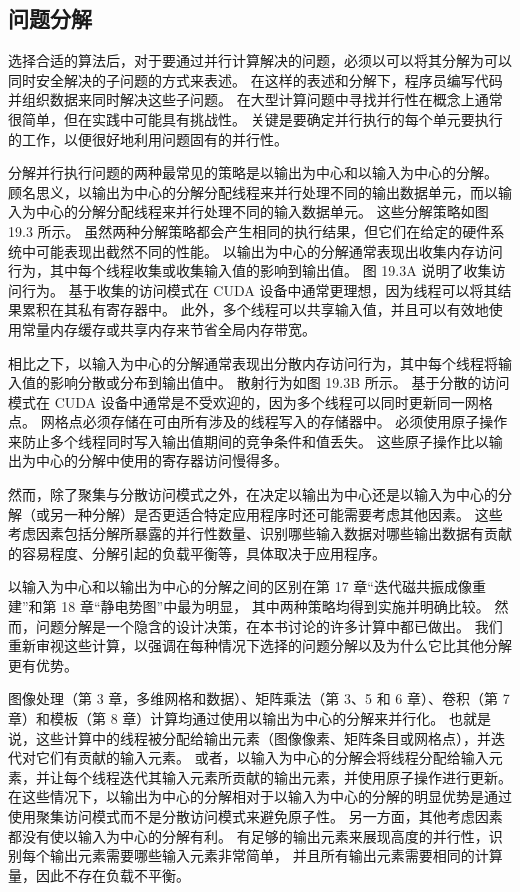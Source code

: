\subsection{问题分解}
选择合适的算法后，对于要通过并行计算解决的问题，必须以可以将其分解为可以同时安全解决的子问题的方式来表述。 
在这样的表述和分解下，程序员编写代码并组织数据来同时解决这些子问题。 
在大型计算问题中寻找并行性在概念上通常很简单，但在实践中可能具有挑战性。 
关键是要确定并行执行的每个单元要执行的工作，以便很好地利用问题固有的并行性。

分解并行执行问题的两种最常见的策略是以输出为中心和以输入为中心的分解。 
顾名思义，以输出为中心的分解分配线程来并行处理不同的输出数据单元，而以输入为中心的分解分配线程来并行处理不同的输入数据单元。 
这些分解策略如图 19.3 所示。 虽然两种分解策略都会产生相同的执行结果，但它们在给定的硬件系统中可能表现出截然不同的性能。 
以输出为中心的分解通常表现出收集内存访问行为，其中每个线程收集或收集输入值的影响到输出值。 
图 19.3A 说明了收集访问行为。 基于收集的访问模式在 CUDA 设备中通常更理想，因为线程可以将其结果累积在其私有寄存器中。 
此外，多个线程可以共享输入值，并且可以有效地使用常量内存缓存或共享内存来节省全局内存带宽。

相比之下，以输入为中心的分解通常表现出分散内存访问行为，其中每个线程将输入值的影响分散或分布到输出值中。 
散射行为如图 19.3B 所示。 基于分散的访问模式在 CUDA 设备中通常是不受欢迎的，因为多个线程可以同时更新同一网格点。 
网格点必须存储在可由所有涉及的线程写入的存储器中。 必须使用原子操作来防止多个线程同时写入输出值期间的竞争条件和值丢失。 
这些原子操作比以输出为中心的分解中使用的寄存器访问慢得多。

然而，除了聚集与分散访问模式之外，在决定以输出为中心还是以输入为中心的分解（或另一种分解）是否更适合特定应用程序时还可能需要考虑其他因素。 
这些考虑因素包括分解所暴露的并行性数量、识别哪些输入数据对哪些输出数据有贡献的容易程度、分解引起的负载平衡等，具体取决于应用程序。

以输入为中心和以输出为中心的分解之间的区别在第 17 章“迭代磁共振成像重建”和第 18 章“静电势图”中最为明显，
其中两种策略均得到实施并明确比较。 然而，问题分解是一个隐含的设计决策，在本书讨论的许多计算中都已做出。 
我们重新审视这些计算，以强调在每种情况下选择的问题分解以及为什么它比其他分解更有优势。

图像处理（第 3 章，多维网格和数据）、矩阵乘法（第 3、5 和 6 章）、卷积（第 7 章）和模板（第 8 章）计算均通过使用以输出为中心的分解来并行化。 
也就是说，这些计算中的线程被分配给输出元素（图像像素、矩阵条目或网格点），并迭代对它们有贡献的输入元素。 
或者，以输入为中心的分解会将线程分配给输入元素，并让每个线程迭代其输入元素所贡献的输出元素，并使用原子操作进行更新。 
在这些情况下，以输出为中心的分解相对于以输入为中心的分解的明显优势是通过使用聚集访问模式而不是分散访问模式来避免原子性。 
另一方面，其他考虑因素都没有使以输入为中心的分解有利。 
有足够的输出元素来展现高度的并行性，识别每个输出元素需要哪些输入元素非常简单，
并且所有输出元素需要相同的计算量，因此不存在负载不平衡。

